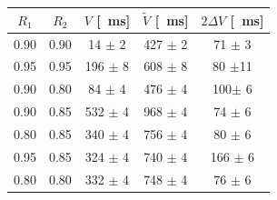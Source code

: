 \documentclass[10pt,oneside,a4paper]{article}
\newenvironment{Figure}
  {\par\medskip\noindent\minipage{\linewidth}}
  {\endminipage\par\medskip}
\begin{document}
\begin{center}
\label{tab:parte_due}
\begin{tabular}{c|c|c|c|c}
$R_1$ & $R_2$ & $V$ [\SI{}{ms}] & $\tilde V$ [\SI{}{ms}] & $2\Delta V$ [\SI{}{ms}]\\
\hline
 0.90 & 0.90 &  14 $\pm$ 2 & 427 $\pm$  2 &  71 $\pm$  3 \\
 0.95 & 0.95 & 196 $\pm$ 8 & 608 $\pm$ 8 &  80  $\pm$11 \\
 0.90 & 0.80 &  84 $\pm$ 4 & 476 $\pm$  4 & 100$\pm$   6 \\
 0.90 & 0.85 & 532 $\pm$ 4 & 968 $\pm$ 4 &  74  $\pm$ 6 \\
 0.80 & 0.85 & 340 $\pm$ 4 & 756 $\pm$ 4 &  80  $\pm$ 6 \\
 0.95 & 0.85 & 324 $\pm$ 4 & 740 $\pm$ 4 & 166 $\pm$  6 \\
 0.80 & 0.80 & 332 $\pm$ 4 & 748 $\pm$ 4 &  76  $\pm$ 6 \\
\hline
\end{tabular}
\end{center}













\end{document}
